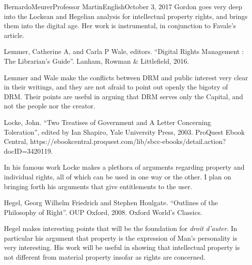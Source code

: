 \documentclass[12pt,letterpaper]{article}
\begin{document}
\begin{mla}{Bernardo}{Meurer}{Professor Martin}{English}{October 3, 2017}
            Gordon goes very deep into the Lockean and Hegelian analysis for intellectual property rights, and brings them into the digital age. Her work is instrumental, in conjunction to Favale's article.

            \bibent
            Lemmer, Catherine A, and Carla P Wale, editors. ``Digital Rights Management : The Librarian's Guide''. Lanham, Rowman \& Littlefield, 2016.

            Lemmer and Wale make the conflicts between DRM and public interest very clear in their writings, and they are not afraid to point out openly the bigotry of DRM. Their points are useful in arguing that DRM serves only the Capital, and not the people nor the creator.

            \bibent
            Locke, John. ``Two Treatises of Government and A Letter Concerning Toleration'', edited by Ian Shapiro, Yale University Press, 2003. ProQuest Ebook Central, https://ebookcentral.proquest.com/lib/sbcc-ebooks/detail.action?docID=3420119.

            In his famous work Locke makes a plethora of arguments regarding property and individual rights, all of which can be used in one way or the other. I plan on bringing forth his arguments that give entitlements to the user.

            \bibent
            Hegel, Georg Wilhelm Friedrich and Stephen Houlgate. ``Outlines of the Philosophy of Right''. OUP Oxford, 2008. Oxford World's Classics.

            Hegel makes interesting points that will be the foundation for \emph{droit d'auter}. In particular his argument that property is the expression of Man's personality is very interesting. His work will be useful in showing that intellectual property is not different from material property insofar as rights are concerned.

        \end{mla}
        
\end{document}
